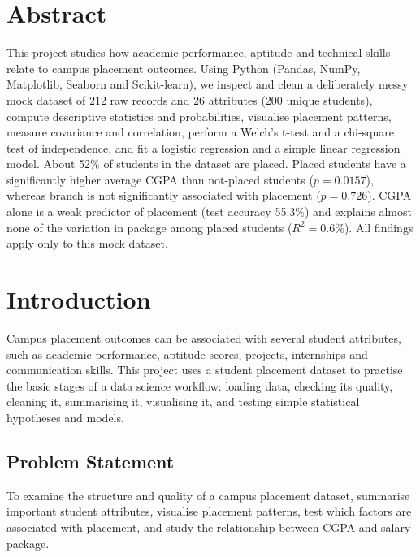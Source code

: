 \documentclass[12pt,a4paper]{article}
\begin{document}
\section*{Abstract}
This project studies how academic performance, aptitude and technical skills relate to campus placement outcomes. Using Python (Pandas, NumPy, Matplotlib, Seaborn and Scikit-learn), we inspect and clean a deliberately messy mock dataset of 212 raw records and 26 attributes (200 unique students), compute descriptive statistics and probabilities, visualise placement patterns, measure covariance and correlation, perform a Welch's t-test and a chi-square test of independence, and fit a logistic regression and a simple linear regression model. About 52\% of students in the dataset are placed. Placed students have a significantly higher average CGPA than not-placed students ($p=0.0157$), whereas branch is not significantly associated with placement ($p=0.726$). CGPA alone is a weak predictor of placement (test accuracy 55.3\%) and explains almost none of the variation in package among placed students ($R^2 = 0.6\%$). All findings apply only to this mock dataset.

\clearpage
\tableofcontents
\clearpage
{}

\section{Introduction}
Campus placement outcomes can be associated with several student attributes, such as academic performance, aptitude scores, projects, internships and communication skills. This project uses a student placement dataset to practise the basic stages of a data science workflow: loading data, checking its quality, cleaning it, summarising it, visualising it, and testing simple statistical hypotheses and models.

\subsection{Problem Statement}
To examine the structure and quality of a campus placement dataset, summarise important student attributes, visualise placement patterns, test which factors are associated with placement, and study the relationship between CGPA and salary package.
\end{document}
